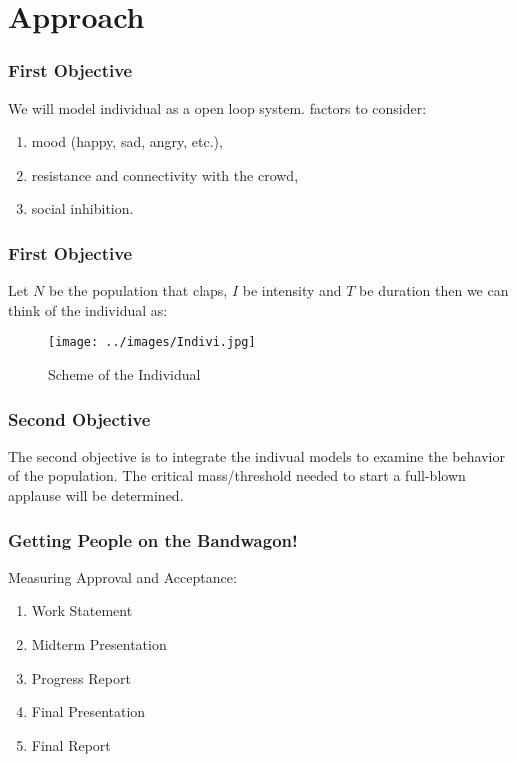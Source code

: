 \documentclass[compress,handout,10pt]{beamer}
\let\olditem\item
\renewcommand{\item}{\setlength{\itemsep}{0.5\baselineskip}\olditem}
\begin{document}
\section{Approach}
\begin{frame}
\frametitle{First Objective}
We will model individual as a open loop system.\newline{} factors to consider: \newline
	\begin{enumerate}
		\item mood (happy, sad, angry, etc.),\newline \newline
		\item resistance and connectivity with the crowd,\newline\newline
		\item social inhibition.		
	\end{enumerate}
\end{frame}

\begin{frame}
\frametitle{First Objective}
Let $N$ be the population that claps, $I$ be intensity and $T$ be duration then we can think of the individual as:\newline\newline\newline

\begin{figure}[h]
    \begin{center}
        \texttt{[image: ../images/Indivi.jpg]}
    \end{center}
    \caption{Scheme of the Individual}
    \label{fig:individual}
\end{figure}

\end{frame}

\begin{frame}
\frametitle{Second Objective}
The second objective is to integrate the indivual models to examine the behavior of the population.\newline \newline
The critical mass/threshold needed to start a full-blown applause will be determined.
\end{frame}



\begin{frame}
    \frametitle{Getting People on the Bandwagon!}
    Measuring Approval and Acceptance:
    \vspace{7pt}
             \begin{enumerate}
                 \item Work Statement
                 \item Midterm Presentation
                 \item Progress Report
                 \item Final Presentation
                 \item Final Report
             \end{enumerate}
\end{frame}
\end{document}
